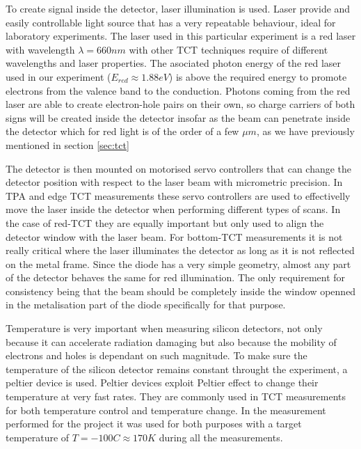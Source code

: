 To create signal inside the detector, laser illumination is used. Laser provide and easily controllable light source that has a very repeatable behaviour, ideal for laboratory experiments. The laser used in this particular experiment is a red laser with wavelength $\lambda = 660nm$ with other TCT techniques require of different wavelengths and laser properties. The asociated photon energy of the red laser used in our experiment ($E_{red} \approx 1.88 eV$) is above the required energy to promote electrons from the valence band to the conduction. Photons coming from the red laser are able to create electron-hole pairs on their own, so charge carriers of both signs will be created inside the detector insofar as the beam can penetrate inside the detector which for red light is of the order of a few $\mu m$, as we have previously mentioned in section \ref{sec:tct}

The detector is then mounted on motorised servo controllers that can change the detector position with respect to the laser beam with micrometric precision. In TPA and edge TCT measurements these servo controllers are used to effectivelly move the laser inside the detector when performing different types of scans. In the case of red-TCT they are equally important but only used to align the detector window with the laser beam. For bottom-TCT measurements it is not really critical where the laser illuminates the detector as long as it is not reflected on the metal frame. Since the diode has a very simple geometry, almost any part of the detector behaves the same for red illumination. The only requirement for consistency being that the beam should be completely inside the window openned in the metalisation part of the diode specifically for that purpose.

Temperature is very important when measuring silicon detectors, not only because it can accelerate radiation damaging but also because the mobility of electrons and holes is dependant on such magnitude. To make sure the temperature of the silicon detector remains constant throught the experiment, a peltier device is used. Peltier devices exploit Peltier effect to change their temperature at very fast rates. They are commonly used in TCT measurements for both temperature control and temperature change. In the measurement performed for the project it was used for both purposes with a target temperature of $T = -100C \approx 170K$ during all the measurements.


